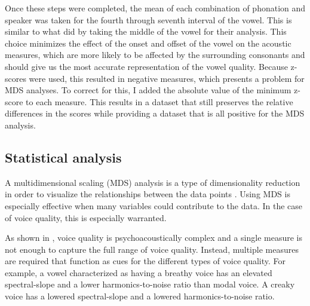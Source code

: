 Once these steps were completed, the mean of each combination of phonation and speaker was taken for the fourth through seventh interval of the vowel. This is similar to what \citet{keatingCrosslanguageAcousticSpace2023} did by taking the middle of the vowel for their analysis. This choice minimizes the effect of the onset and offset of the vowel on the acoustic measures, which are more likely to be affected by the surrounding consonants and should give us the most accurate representation of the vowel quality. Because z-scores were used, this resulted in negative measures, which presents a problem for MDS analyses. To correct for this, I added the absolute value of the minimum z-score to each measure. This results in a dataset that still preserves the relative differences in the scores while providing a dataset that is all positive for the MDS analysis.

\subsection{Statistical analysis} \label{sec:acousticlandscape:statistics}

A multidimensional scaling (MDS) analysis is a type of dimensionality reduction in order to visualize the relationships between the data points \citep{kruskalMultidimensionalScaling1978}. Using MDS is especially effective when many variables could contribute to the data. In the case of voice quality, this is especially warranted. 

As shown in \citet{kreimanUnifiedTheoryVoice2014,kreimanValidatingPsychoacousticModel2021,garellekAcousticDiscriminabilityComplex2020}, voice quality is psychoacoustically complex and a single measure is not enough to capture the full range of voice quality. Instead, multiple measures are required that function as cues for the different types of voice quality. For example, a vowel characterized as having a breathy voice has an elevated spectral-slope and a lower harmonics-to-noise ratio than modal voice. A creaky voice has a lowered spectral-slope and a lowered harmonics-to-noise ratio. 

